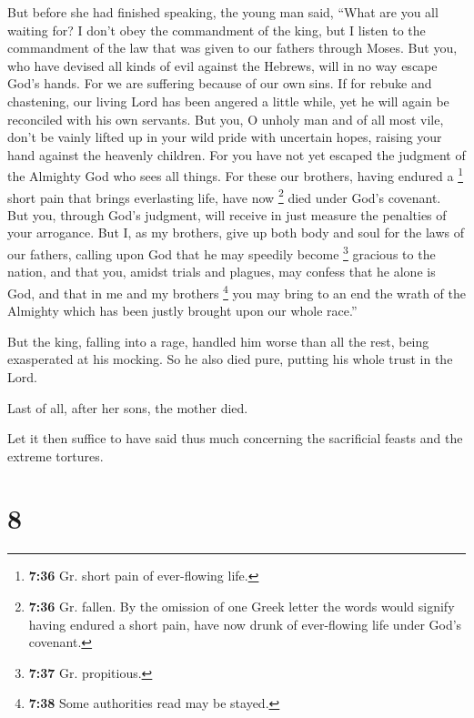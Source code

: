  But before she had finished speaking, the young man
said, ``What are you all waiting for? I don't obey the commandment of
the king, but I listen to the commandment of the law that was given to
our fathers through Moses.  But you, who have devised all
kinds of evil against the Hebrews, will in no way escape God's hands.
 For we are suffering because of our own sins.
 If for rebuke and chastening, our living Lord has been
angered a little while, yet he will again be reconciled with his own
servants.  But you, O unholy man and of all most vile,
don't be vainly lifted up in your wild pride with uncertain hopes,
raising your hand against the heavenly children.  For you
have not yet escaped the judgment of the Almighty God who sees all
things.  For these our brothers, having endured a
\footnote{\textbf{7:36} Gr. short pain of ever-flowing life.} short pain
that brings everlasting life, have now \footnote{\textbf{7:36} Gr.
  fallen. By the omission of one Greek letter the words would signify
  having endured a short pain, have now drunk of ever-flowing life under
  God's covenant.} died under God's covenant. But you, through God's
judgment, will receive in just measure the penalties of your arrogance.
 But I, as my brothers, give up both body and soul for
the laws of our fathers, calling upon God that he may speedily become
\footnote{\textbf{7:37} Gr. propitious.} gracious to the nation, and
that you, amidst trials and plagues, may confess that he alone is God,
 and that in me and my brothers \footnote{\textbf{7:38}
  Some authorities read may be stayed.} you may bring to an end the
wrath of the Almighty which has been justly brought upon our whole
race.''

 But the king, falling into a rage, handled him worse
than all the rest, being exasperated at his mocking.  So
he also died pure, putting his whole trust in the Lord.

 Last of all, after her sons, the mother died.

 Let it then suffice to have said thus much concerning
the sacrificial feasts and the extreme tortures.

\hypertarget{section-7}{%
\section{8}\label{section-7}}

